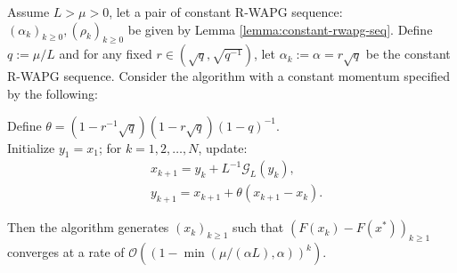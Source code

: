\documentclass[12pt]{article}
\begin{document}
    \begin{theorem}\label{thm:fixed-momentum-fista}
        Assume $L > \mu > 0$, let a pair of constant R-WAPG sequence: $(\alpha_k)_{k \ge0}, (\rho_k)_{k \ge 0}$ be given by Lemma \ref{lemma:constant-rwapg-seq}.
        Define $q := \mu/L$ and for any fixed $r \in \left(\sqrt{q}, \sqrt{q^{-1}}\right)$, let $\alpha_k := \alpha = r \sqrt{q}$ be the constant R-WAPG sequence.
        Consider the algorithm with a constant momentum specified by the following:
        \begin{tcolorbox}
            Define $\theta = \left(1 - r^{-1}\sqrt{q}\right)(1 - r\sqrt{q})(1 - q)^{-1}$.
            \\
            Initialize $y_1 = x_1$; for $k = 1, 2, \ldots, N$, update:
            \begin{align*}
                &x_{k + 1} = y_k + L^{-1}\mathcal G_L (y_k)
                ,
                \\
                & y_{k + 1} = x_{k + 1} + \theta(x_{k + 1} - x_k).
            \end{align*}
        \end{tcolorbox}
        Then the algorithm generates $(x_k)_{k \ge 1}$ such that $(F(x_{k}) - F(x^*))_{k\geq 1}$ converges at a rate of $\mathcal O\left(\left(1 - \min\left(\mu/(\alpha L), \alpha\right)\right)^k\right)$.
    \end{theorem}
\end{document}
